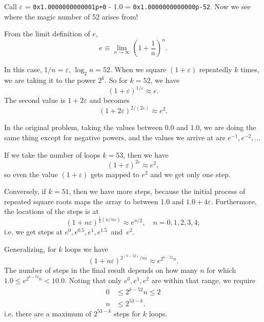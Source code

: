 \documentclass[12pt]{article}
\begin{document}
Call $\varepsilon$ = \texttt{0x1.0000000000001p+0} - 1.0 = \texttt{0x1.0000000000000p-52}. Now we see where the magic number of 52 arises from! 

From the limit definition of $e$,
\begin{equation*}
e \equiv \lim_{n\rightarrow\infty}\left(1 + \frac{1}{n}\right)^n.
\end{equation*}

In this case, $1/n = \varepsilon$, $\log_2{n} = 52$. When we square $(1 + \varepsilon)$ repeatedly $k$ times, we are taking it to the power $2^k$. So for $k = 52$, we have
\begin{equation*}
\left(1 + \varepsilon\right)^{1/\varepsilon} \approx e.
\end{equation*}
The second value is $1 + 2\varepsilon$ and becomes
\begin{equation*}
\left(1 + 2\varepsilon\right)^{2/(2\varepsilon)} \approx e^2.
\end{equation*}

In the original problem, taking the values between 0.0 and 1.0, we are doing the same thing except for negative powers, and the values we arrive at are $e^{-1}, e^{-2}, \dots$

If we take the number of loops $k = 53$, then we have
\begin{equation*}
\left(1 + \varepsilon\right)^{2\varepsilon} \approx e^2,
\end{equation*}
so even the value $(1 + \varepsilon)$ gets mapped to $e^2$ and we get only one step.

Conversely, if $k = 51$, then we have more steps, because the initial process of repeated square roots maps the array to between 1.0 and $1.0 + 4\varepsilon$. Furthermore, the locations of the steps is at
\begin{equation*}
\left(1 + n\varepsilon\right)^{\frac{1}{2}(n/n\varepsilon)} \approx e^{n/2}, \quad n=0,1,2,3,4;
\end{equation*}
i.e. we get steps at $e^0, e^{0.5}, e^{1}, e^{1.5}$~and~$e^2$.

Generalizing, for $k$ loops we have
\begin{equation*}
\left(1 + n\varepsilon\right)^{2^{(k-52)}/n\varepsilon} \approx e^{2^{k-52}n}.
\end{equation*}
The number of steps in the final result depends on how many $n$ for which $1.0 \leq e^{2^{k-52}n} < 10.0$. Noting that only $e^0, e^1, e^2$ are within that range, we require
\begin{equation*}
\begin{aligned}
0 &\leq 2^{k-52}n \leq 2 \\
n &\leq 2^{53 - k}.
\end{aligned}
\end{equation*}
i.e. there are a maximum of $2^{53-k}$ steps for $k$ loops. 
\end{document}
